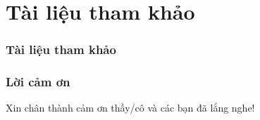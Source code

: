 \section{Tài liệu tham khảo}
\begin{frame}[allowframebreaks]
    \frametitle{Tài liệu tham khảo}
    \printbibliography
\end{frame}

\begin{frame}
    \frametitle{Lời cảm ơn}
    Xin chân thành cảm ơn thầy/cô và các bạn đã lắng nghe!
\end{frame}

